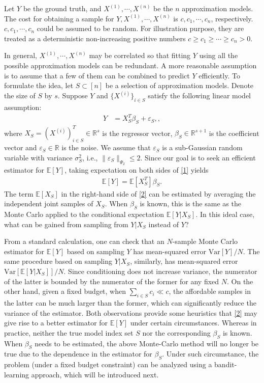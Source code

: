 \documentclass[11pt,a4paper]{amsart}
\numberwithin{equation}{section}
\theoremstyle{plain}
\theoremstyle{definition}
\def\R{{\mathbb R}}
\def\E{{\mathbb E}}
\def\R{{\mathbb R}}
\def\e{{\varepsilon}}
\def\var{{\text{Var}}}
\begin{document}
Let $Y$ be the ground truth, and $X^{(1)}, \cdots, X^{(n)}$ be the $n$ approximation models. 
The cost for obtaining a sample for $Y, X^{(1)}, \cdots, X^{(n)}$ is $c, c_1,\cdots, c_n$, respectively.
$c, c_1, \cdots, c_n$ could be assumed to be random.
For illustration purpose, they are treated as a deterministic non-increasing positive numbers $c\geq c_1\geq\cdots\geq c_n>0$. 

In general, $X^{(1)}, \cdots, X^{(n)}$ may be correlated so that fitting $Y$ using all the possible approximation models can be redundant. 
A more reasonable assumption is to assume that a few of them can be combined to predict $Y$ efficiently.
To formulate the idea,  let $S\subset [n]$ be a selection of approximation models.
Denote the size of $S$ by $s$. 
Suppose $Y$ and $\{X^{(i)}\}_{i\in S}$ satisfy the following linear model assumption:
\begin{align}
Y &= X_S^T\beta_S + \e_S,\label{1},
\end{align}
where $X_S = (X^{(i)})_{i\in S}^T\in\R^{s}$ is the regressor vector, $\beta_S\in\R^{s+1}$ is the coefficient vector and $\e_S\in\R$ is the noise.  
We assume that $\e_S$ is a sub-Gaussian random variable with variance $\sigma_S^2$, i.e., $\|\e_S\|_{\Psi_2}\leq 2$.  
Since our goal is to seek an efficient estimator for $\E[Y]$, taking expectation on both sides of \eqref{1} yields
\begin{align}
\E[Y] = \E[X_S^T]\beta_S.\label{2}
\end{align}
The term $\E[X_S]$ in the right-hand side of \eqref{2} can be estimated by averaging the independent joint samples of $X_S$. 
When $\beta_S$ is known, this is the same as the Monte Carlo applied to the conditional expectation $\E[Y|X_S]$. In this ideal case, what can be gained from sampling from $Y|X_S$ instead of $Y$? 

From a standard calculation, one can check that an $N$-sample Monte Carlo estimator for $\E[Y]$ based on sampling $Y$ has mean-squared error $\var[Y]/N$. The same procedure based on sampling $Y|X_S$, similarly, has mean-squared error $\var[\E[Y|X_S]]/N$. 
Since conditioning does not increase variance, the numerator of the latter is bounded by the numerator of the former for any fixed $N$. 
On the other hand, given a fixed budget, when $\sum_{i\in S}c_i\ll c$, the affordable samples in the latter can be much larger than the former, which can significantly reduce the variance of the estimator.  
Both observations provide some heuristics that \eqref{2} may give rise to a better estimator for $\E[Y]$ under certain circumstances. 
Whereas in practice, neither the true model index set $S$ nor the corresponding $\beta_S$ is known. 
When $\beta_S$ needs to be estimated, the above Monte-Carlo method will no longer be true due to the dependence in the estimator for $\beta_S$. 
Under such circumstance, the problem (under a fixed budget constraint) can be analyzed using a bandit-learning approach, which will be introduced next. 
\end{document}

